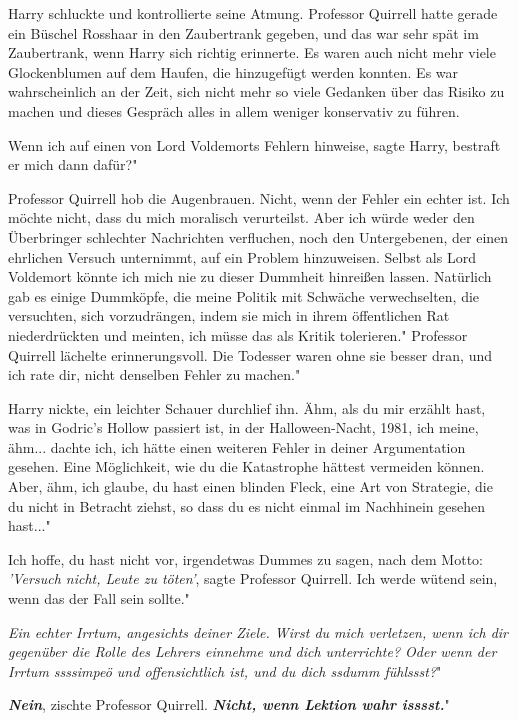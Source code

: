 Harry schluckte und kontrollierte seine Atmung. Professor Quirrell hatte gerade
ein Büschel Rosshaar in den Zaubertrank gegeben, und das war sehr spät im
Zaubertrank, wenn Harry sich richtig erinnerte. Es waren auch nicht mehr viele
Glockenblumen auf dem Haufen, die hinzugefügt werden konnten. Es war
wahrscheinlich an der Zeit, sich nicht mehr so viele Gedanken über das Risiko zu
machen und dieses Gespräch alles in allem weniger konservativ zu führen.

\glqq Wenn ich auf einen von Lord Voldemorts Fehlern hinweise\grqq{}, sagte
Harry, \glqq bestraft er mich dann dafür?"

Professor Quirrell hob die Augenbrauen. \glqq Nicht, wenn der Fehler ein echter
ist. Ich möchte nicht, dass du mich moralisch verurteilst. Aber ich würde weder
den Überbringer schlechter Nachrichten verfluchen, noch den Untergebenen, der
einen ehrlichen Versuch unternimmt, auf ein Problem hinzuweisen. Selbst als Lord
Voldemort könnte ich mich nie zu dieser Dummheit hinreißen lassen. Natürlich gab
es einige Dummköpfe, die meine Politik mit Schwäche verwechselten, die
versuchten, sich vorzudrängen, indem sie mich in ihrem öffentlichen Rat
niederdrückten und meinten, ich müsse das als Kritik tolerieren." Professor
Quirrell lächelte erinnerungsvoll. \glqq Die Todesser waren ohne sie besser
dran, und ich rate dir, nicht denselben Fehler zu machen."

Harry nickte, ein leichter Schauer durchlief ihn. \glqq Ähm, als du mir erzählt
hast, was in Godric's Hollow passiert ist, in der Halloween-Nacht, 1981, ich
meine, ähm... dachte ich, ich hätte einen weiteren Fehler in deiner
Argumentation gesehen. Eine Möglichkeit, wie du die Katastrophe hättest
vermeiden können. Aber, ähm, ich glaube, du hast einen blinden Fleck, eine Art
von Strategie, die du nicht in Betracht ziehst, so dass du es nicht einmal im
Nachhinein gesehen hast..."

\glqq Ich hoffe, du hast nicht vor, irgendetwas Dummes zu sagen, nach dem Motto:
\emph{'Versuch nicht, Leute zu töten'}\grqq{}, sagte Professor Quirrell. \glqq
Ich werde wütend sein, wenn das der Fall sein sollte."

\glqq \emph{Ein echter Irrtum, angesichts deiner Ziele. Wirst du mich verletzen,
wenn ich dir gegenüber die Rolle des Lehrers einnehme und dich unterrichte? Oder
wenn der Irrtum ssssimpeö und offensichtlich ist, und du dich ssdumm fühlssst?}"

\glqq \textbf{\emph{Nein}}\grqq{}, zischte Professor Quirrell. \glqq
\textbf{\emph{Nicht, wenn Lektion wahr isssst.}}"

